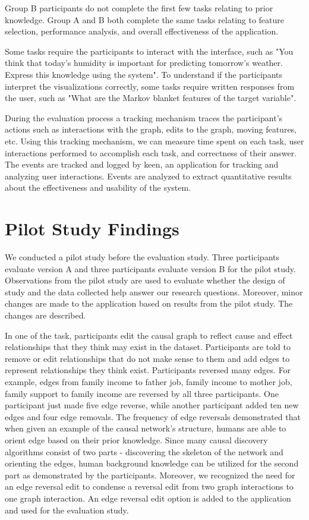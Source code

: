 Group B participants do not complete the first few tasks relating to prior knowledge. Group A and B both complete the same tasks relating to feature selection, performance analysis, and overall effectiveness of the application.

Some tasks require the participants to interact with the interface, such as "You think that today's humidity is important for predicting tomorrow's weather. Express this knowledge using the system". To understand if the participants interpret the visualizations correctly, some tasks require written responses from the user, such as "What are the Markov blanket features of the target variable".

During the evaluation process a tracking mechanism traces the participant's actions such as interactions with the graph, edits to the graph, moving features, etc. Using this tracking mechanism, we can measure time spent on each task, user interactions performed to accomplish each task, and correctness of their answer. The events are tracked and logged by keen, an application for tracking and analyzing user interactions. Events are analyzed to extract quantitative results about the effectiveness and usability of the system.

\section { Pilot Study Findings }
We conducted a pilot study before the evaluation study. Three participants evaluate version A and three participants evaluate version B for the pilot study. Observations from the pilot study are used to evaluate whether the design of study and the data collected help answer our research questions. Moreover, minor changes are made to the application based on results from the pilot study. The changes are described.

In one of the task, participants edit the causal graph to reflect cause and effect relationships that they think may exist in the dataset. Participants are told to remove or edit relationships that do not make sense to them and add edges to represent relationships they think exist. Participants reversed many edges. For example, edges from family income to father job, family income to mother job, family support to family income are reversed by all three participants. One participant just made five edge reverse, while another participant added ten new edges and four edge removals. The frequency of edge reversals demonstrated that when given an example of the causal network's structure, humans are able to orient edge based on their prior knowledge. Since many causal discovery algorithms consist of two parts - discovering the skeleton of the network and orienting the edges, human background knowledge can be utilized for the second part as demonstrated by the participants. Moreover, we recognized the need for an edge reversal edit to condense a reversal edit from two graph interactions to one graph interaction. An edge reversal edit option is added to the application and used for the evaluation study.

